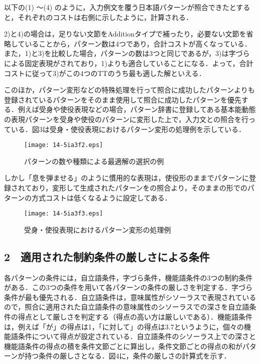 \documentclass[japanese]{jnlp_1.4}
\begin{document}
以下の(1) 〜(4) のように，入力例文を覆う日本語パターンが照合できたとすると，それぞれのコストは右側に示したように，計算される．

2)と4)の場合は，足りない文節をAdditionタイプで補ったり，必要ない文節を省略していることから，パターン数は4つであり，合計コストが高くなっている．また，1)と3)を比較した場合，パターンの数は3つと同じであるが，3)は字づらによる固定表現がされており，1)よりも適合していることになる．よって，合計コストに従って3)がこの4つのTTのうち最も適した解といえる．

このほか，パターン変形などの特殊処理を行って照合に成功したパターンよりも登録されているパターンをそのまま使用して照合に成功したパターンを優先する．例えば受身や使役表現などの場合，パターン辞書に登録してある基本能動態の表現パターンを受身や使役のパターンに変形した上で，入力文との照合を行っている．図3は受身・使役表現におけるパターン変形の処理例を示している．

\begin{figure}[t]
\begin{center}
\texttt{[image: 14-5ia3f2.eps]}
\end{center}
 \caption{パターンの数や種類による最適解の選択の例}
\end{figure}

しかし「息を弾ませる」のように慣用的な表現は，使役形のままでパターンに登録されており，変形して生成されたパターンをの照合より，そのままの形でのパターンの方式コストは低くなるように設定してある．

\begin{figure}[t]
\begin{center}
\texttt{[image: 14-5ia3f3.eps]}
\end{center}
 \caption{受身・使役表現におけるパターン変形の処理例}
\end{figure}

\subsection*{2　適用された制約条件の厳しさによる条件}

各パターンの条件には，自立語条件，字づら条件，機能語条件の3つの制約条件がある．この3つの条件を用いて各パターンの条件の厳しさを判定する．字づら条件が最も優先される．自立語条件は，意味属性がシソーラスで表現されているので，照合に適用された自立語条件の意味属性のシソーラスでの深さを自立語条件の得点として厳しさを判定する（得点の高い方は厳しいである）．機能語条件は，例えば「が」の得点は1，「に対して」の得点は3.7というように，個々の機能語条件について得点が設定されている．自立語条件のシソーラス上での深さと機能語条件の得点の積を条件文節ごとに算出し，条件文節ごとの得点の和がパターンが持つ条件の厳しさとなる．図4に，条件の厳しさの計算式を示す．
\end{document}
